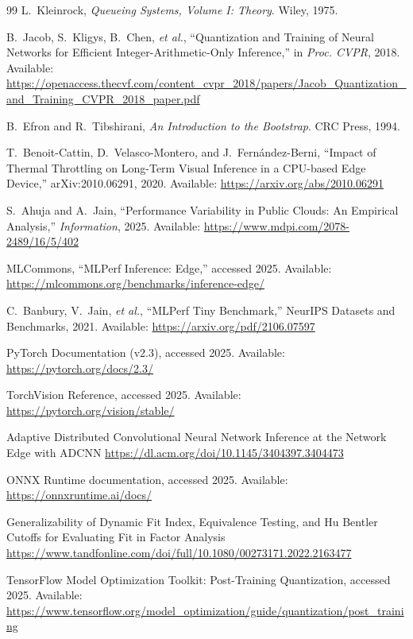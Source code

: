 \documentclass{article}
\begin{document}
\begin{thebibliography}{99}
L.~Kleinrock, \emph{Queueing Systems, Volume I: Theory}. Wiley, 1975.

B.~Jacob, S.~Kligys, B.~Chen, \emph{et al.}, “Quantization and Training of Neural Networks for Efficient Integer-Arithmetic-Only Inference,” in \emph{Proc. CVPR}, 2018. Available: \url{https://openaccess.thecvf.com/content_cvpr_2018/papers/Jacob_Quantization_and_Training_CVPR_2018_paper.pdf}

B.~Efron and R.~Tibshirani, \emph{An Introduction to the Bootstrap}. CRC Press, 1994.

T.~Benoit-Cattin, D.~Velasco-Montero, and J.~Fernández-Berni, “Impact of Thermal Throttling on Long-Term Visual Inference in a CPU-based Edge Device,” arXiv:2010.06291, 2020. Available: \url{https://arxiv.org/abs/2010.06291}

S.~Ahuja and A.~Jain, “Performance Variability in Public Clouds: An Empirical Analysis,” \emph{Information}, 2025. Available: \url{https://www.mdpi.com/2078-2489/16/5/402}

MLCommons, “MLPerf Inference: Edge,” accessed 2025. Available: \url{https://mlcommons.org/benchmarks/inference-edge/}

C.~Banbury, V.~Jain, \emph{et al.}, “MLPerf Tiny Benchmark,” NeurIPS Datasets and Benchmarks, 2021. Available: \url{https://arxiv.org/pdf/2106.07597}

PyTorch Documentation (v2.3), accessed 2025. Available: \url{https://pytorch.org/docs/2.3/}

TorchVision Reference, accessed 2025. Available: \url{https://pytorch.org/vision/stable/}

Adaptive Distributed Convolutional Neural Network Inference at the Network Edge with ADCNN
\url{https://dl.acm.org/doi/10.1145/3404397.3404473}

ONNX Runtime documentation, accessed 2025. Available: \url{https://onnxruntime.ai/docs/}

Generalizability of Dynamic Fit Index, Equivalence Testing, and Hu Bentler Cutoffs for Evaluating Fit in Factor Analysis
\url{https://www.tandfonline.com/doi/full/10.1080/00273171.2022.2163477}

TensorFlow Model Optimization Toolkit: Post-Training Quantization, accessed 2025. Available: \url{https://www.tensorflow.org/model_optimization/guide/quantization/post_training}


\end{thebibliography}
\end{document}
